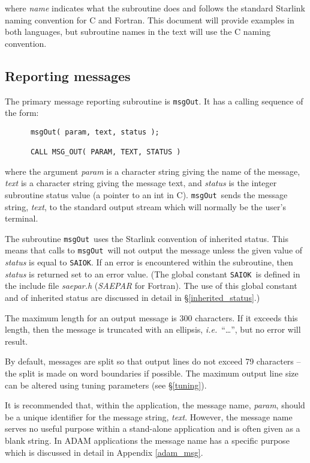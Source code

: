 \documentclass[twoside,11pt]{article}
\newcommand{\htmlref}[2]{#1}
\newcommand{\latex}[1]{#1}
\newcommand{\xlabel}[1]{}
\renewcommand{\_}{\texttt{\symbol{95}}}
\newcommand{\func}[1]{\texttt{#1}}
\newcommand{\farg}[1]{\textit{#1}}
\newcommand{\const}[1]{\texttt{#1}}
\newcommand{\fname}[1]{\textit{#1}}
\newcommand{\saiok}{\const{SAI\_\_OK}}
\newcommand{\msgout}{\func{msgOut}}
\begin{document}
where \farg{name} indicates what the subroutine does and follows the
standard Starlink naming convention for C and Fortran. This document will
provide examples in both languages, but subroutine names in the text
will use the C naming convention.

\subsection{\xlabel{reporting_messages}Reporting messages}

The primary message reporting subroutine is \msgout.
It has a calling sequence of the form:

\begin {small}
\begin{verbatim}
      msgOut( param, text, status );

      CALL MSG_OUT( PARAM, TEXT, STATUS )
\end{verbatim}
\end {small}

where the argument \farg{param} is a character string giving the name of the message,
\farg{text} is a character string giving the message text, and \farg{status} is the
integer subroutine status value (a pointer to an int in C). 
\msgout\ sends the message string, \farg{text}, to the
standard output stream which will normally be the user's terminal.

The subroutine \msgout\ uses the Starlink convention of 
\htmlref{inherited status}{inherited_status}. 
This means that calls to \msgout\ will not output the message unless the 
given value of \farg{status} is equal to \saiok.
If an error is encountered within the subroutine, then \farg{status} is returned
set to an error value. 
(The global constant \saiok\ is defined in the include file
\fname{sae\_par.h} (\fname{SAE\_PAR} for Fortran). 
\latex{The use of this global constant and of inherited status are discussed in detail
in \S\ref{inherited_status}.}) 

The maximum length for an output message is 300 characters.
If it exceeds this length, then the message is truncated with
an ellipsis, \textit{i.e.}\ ``\ldots'', but no error will result.

By default, messages are split so that output lines do not exceed 
79 characters -- the split is made on word boundaries if possible. 
The maximum output line size can be altered using
\htmlref{tuning parameters}{tuning}\latex{ (see \S\ref{tuning})}.

It is recommended that,
within the application, the message name, \farg{param}, should be a unique identifier 
for the message string, \farg{text}. 
However, the message name serves no useful purpose within a stand-alone 
application and is often given as a blank string.
In ADAM applications the message name has a
\htmlref
{specific purpose}{mespar_sect}\latex{ which is discussed in detail in Appendix \ref{adam_msg}}.
\end{document}

